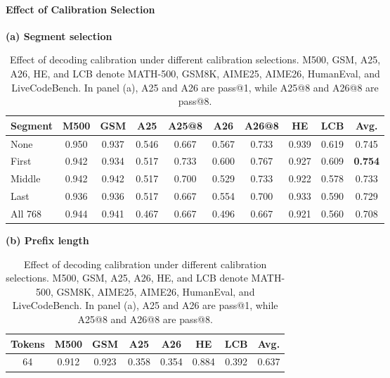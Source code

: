 \documentclass{article}
\begin{document}
\paragraph{Effect of Calibration Selection}\label{abl:calibration}
\begin{table}[!ht]
\centering
\caption{Effect of decoding calibration under different calibration selections. M500, GSM, A25, A26, HE, and LCB denote MATH-500, GSM8K, AIME25, AIME26, HumanEval, and LiveCodeBench. In panel (a), A25 and A26 are pass@1, while A25@8 and A26@8 are pass@8.}
\label{tab:ablation:decoding_calibration}
{\footnotesize
\begin{minipage}[t]{0.57\textwidth}
\centering
\textbf{(a) Segment selection}\par\smallskip
\setlength{\tabcolsep}{2pt}
\begin{adjustbox}{max width=\linewidth}
\begin{tabular}{l|ccccccccc}
\toprule
\textbf{Segment} & \textbf{M500} & \textbf{GSM} & \textbf{A25} & \textbf{A25@8}& \textbf{A26} & \textbf{A26@8} & \textbf{HE} & \textbf{LCB} & \textbf{Avg.} \\
\midrule
None & 0.950 & 0.937 & 0.546 & 0.667 & 0.567 & 0.733 & 0.939 & 0.619 & 0.745 \\
\rowcolor{blue!10} First & 0.942 & 0.934 & 0.517 & 0.733 & 0.600 & 0.767 & 0.927 & 0.609 & \textbf{0.754} \\
Middle & 0.942 & 0.942 & 0.517 & 0.700 & 0.529 & 0.733 & 0.922 & 0.578 & 0.733 \\
Last & 0.936 & 0.936 & 0.517 & 0.667 & 0.554 & 0.700 & 0.933 & 0.590 & 0.729 \\
All 768 & 0.944 & 0.941 & 0.467 & 0.667 & 0.496 & 0.667 & 0.921 & 0.560 & 0.708 \\
\bottomrule
\end{tabular}
\end{adjustbox}
\end{minipage}\hfill
\begin{minipage}[t]{0.42\textwidth}
\centering
\textbf{(b) Prefix length}\par\smallskip
\setlength{\tabcolsep}{2pt}
\begin{adjustbox}{max width=\linewidth}
\begin{tabular}{c|ccccccc}
\toprule
\textbf{Tokens} & \textbf{M500} & \textbf{GSM} & \textbf{A25} & \textbf{A26} & \textbf{HE} & \textbf{LCB} & \textbf{Avg.} \\
\midrule
64 & 0.912 & 0.923 & 0.358 & 0.354 & 0.884 & 0.392 & 0.637 \\

\end{tabular}
\end{adjustbox}
\end{minipage}}
\end{table}
\end{document}
